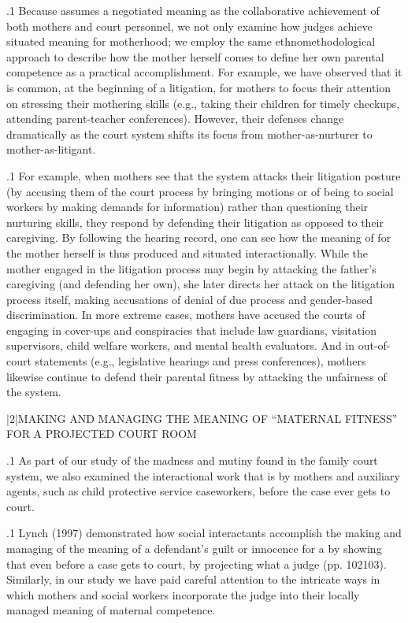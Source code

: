 \documentclass[11pt, twoside]{article}
\begin{document}
{\p.1{%
Because  assumes a negotiated meaning as the collaborative achievement of both mothers and court personnel, we not
only examine how judges achieve situated meaning for motherhood;
we employ the same ethnomethodological approach to describe how
the mother herself comes to define her own parental competence as
a practical accomplishment. For example, we have observed that it is
common, at the beginning of a litigation, for mothers to focus their attention on stressing their mothering skills (e.g., taking their children
for timely checkups, attending parent-teacher conferences). However,
their defenses change dramatically as the court system shifts its focus
from mother-as-nurturer to mother-as-litigant.
}%

\p.1{%
For example, when mothers see that the system attacks their litigation
posture (by accusing them of  the court process by bringing
 motions or of being  to social workers by making
demands for information) rather than questioning their nurturing skills,
they respond by defending their litigation as opposed to their caregiving.
By following the hearing record, one can see how the meaning of
 for the mother herself is thus produced and situated interactionally. While the mother engaged in the litigation process
may begin by attacking the father’s caregiving (and defending her own),
she later directs her attack on the litigation process itself, making accusations of denial of due process and gender-based discrimination. In
more extreme cases, mothers have accused the courts of engaging in
cover-ups and conspiracies that include law guardians, visitation supervisors, child welfare workers, and mental health evaluators. And
in out-of-court statements (e.g., legislative hearings and press conferences), mothers likewise continue to defend their parental fitness by
attacking the unfairness of the system.
}%


\s|2|{MAKING AND MANAGING THE MEANING OF ``MATERNAL FITNESS'' FOR A PROJECTED COURT ROOM}

\p.1{%
As part of our study of the madness and mutiny found in the family court
system, we also examined the interactional work that is  by mothers and auxiliary agents, such as child protective
service caseworkers, before the case ever gets to court.
}%

\p.1{%
Lynch (1997) demonstrated how social interactants accomplish the
making and managing of the meaning of a defendant’s guilt or innocence for a  by showing that even before a case
gets to court,  by projecting
what a judge  (pp. 102\ndash{}103). Similarly, in our study we
have paid careful attention to the intricate ways in which mothers and
social workers incorporate the judge into their locally managed meaning
of maternal competence.
}%

}
\end{document}
